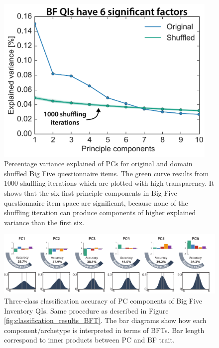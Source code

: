 \begin{figure}[h!]
	\centering
	\begin{minipage}[l]{0.5\textwidth}
		\flushleft
		\includegraphics[width=0.95\textwidth]{figures/significantPCs}
	\end{minipage}
	\begin{minipage}[r]{0.49\textwidth}
		\flushright
		\caption{\label{fig:significantPCs}Percentage variance explained of PCs for original and domain shuffled Big Five questionnaire items. The green curve results from 1000 shuffling iterations which are plotted with high transparency. It shows that the six first principle components in Big Five questionnaire item space are significant, because none of the shuffling iteration can produce components of higher explained variance than the first six.}
	\end{minipage}
\end{figure}

\begin{figure}[h!]
	\centering
	\includegraphics[width=\textwidth]{figures/classification_results_PCA}
	\caption{\label{fig:classification_results_PCA} Three-class classification accuracy of PC components of Big Five Inventory QIs\cite{facet54big}. Same procedure as described in Figure \ref{fig:classification_results_BFT}. The bar diagrams show how each component/archetype is interpreted in terms of BFTs. Bar length correspond to inner products between PC and BF trait.}
\end{figure}
